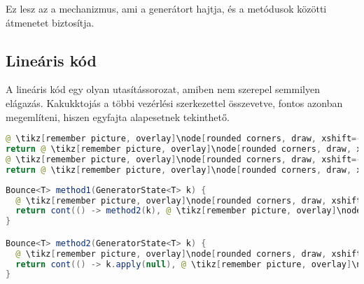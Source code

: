 Ez lesz az a mechanizmus, ami a generátort hajtja, és a metódusok közötti átmenetet biztosítja.

\subsection{Lineáris kód}

A lineáris kód egy olyan utasítássorozat, amiben nem szerepel semmilyen elágazás. Kakukktojás a többi vezérlési szerkezettel összevetve, fontos azonban megemlíteni, hiszen egyfajta alapesetnek tekinthető.

\begin{center}
\begin{mdframed}
\begin{minipage}[t]{0.4\textwidth}
\begin{lstlisting}[language=Java, numbers=none, breaklines=true]
@ \tikz[remember picture, overlay]\node[rounded corners, draw, xshift=-0.1cm, inner sep=5pt, anchor=west] {Kódrészlet \#1}; \vspace*{0.5cm} @ 
return @ \tikz[remember picture, overlay]\node[rounded corners, draw, xshift=-0.1cm, inner sep=5pt, anchor=west, yshift=0.1cm] {Kifejezés \#1}; \vspace*{0.3cm} @
@ \tikz[remember picture, overlay]\node[rounded corners, draw, xshift=-0.1cm, inner sep=5pt, anchor=west] {Kódrészlet \#2}; \vspace*{0.5cm} @ 
return @ \tikz[remember picture, overlay]\node[rounded corners, draw, xshift=-0.1cm, inner sep=5pt, anchor=west, yshift=0.1cm] {Kifejezés \#2}; \vspace*{0.3cm} @
\end{lstlisting}
\end{minipage} 
\begin{minipage}[t]{0.6\textwidth}
\begin{lstlisting}[language=Java, numbers=none, breaklines=true]
Bounce<T> method1(GeneratorState<T> k) {
  @ \tikz[remember picture, overlay]\node[rounded corners, draw, xshift=-0.1cm, inner sep=5pt, anchor=west] {Kódrészlet \#1}; \vspace*{0.3cm} @
  return cont(() -> method2(k), @ \tikz[remember picture, overlay]\node[rounded corners, draw, xshift=-0.1cm, inner sep=5pt, anchor=west, yshift=0.1cm] {Kifejezés \#1}; \vspace*{0.2cm} \hspace*{1.75cm} @);
}

Bounce<T> method2(GeneratorState<T> k) {
  @ \tikz[remember picture, overlay]\node[rounded corners, draw, xshift=-0.1cm, inner sep=5pt, anchor=west] {Kódrészlet \#2}; \vspace*{0.3cm} @
  return cont(() -> k.apply(null), @ \tikz[remember picture, overlay]\node[rounded corners, draw, xshift=-0.2cm, inner sep=5pt, anchor=west, yshift=0.1cm] {Kifejezés \#2}; \vspace*{0.2cm} \hspace*{1.6cm} @);
}
\end{lstlisting} 
\end{minipage}
\end{mdframed}
\label{GenLinear}
\end{center}

